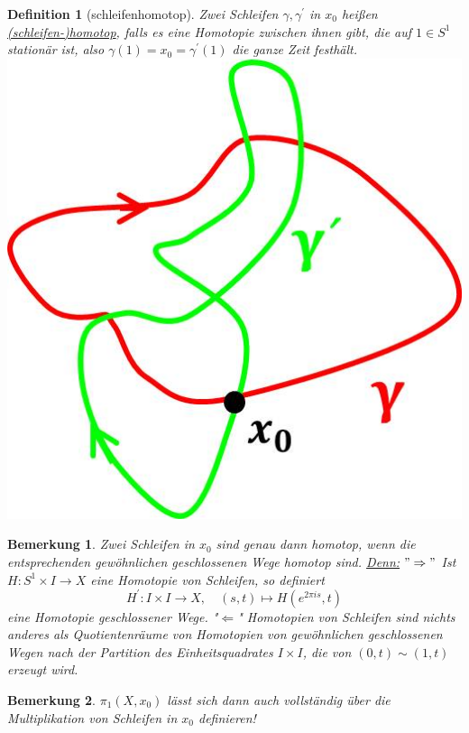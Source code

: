 \documentclass[a4paper,11pt,notitlepage]{report}
\newtheorem{definition}{Definition}[chapter]
\newtheorem{remark}{Bemerkung}[chapter]
\begin{document}
\begin{definition}[schleifenhomotop]
	Zwei Schleifen $\gamma, \gamma^\prime$ in $x_0$ heißen \underline{(schleifen-)homotop}, falls es eine Homotopie zwischen ihnen gibt, die auf $1 \in S^1$ stationär ist, also
	$\gamma(1) = x_0 = \gamma^\prime(1)$ die ganze Zeit festhält.
	 \newline \includegraphics[scale=0.3]{images/schleifenhomotop.jpg}
\end{definition}

\begin{remark}{}
	Zwei Schleifen in $x_0$ sind genau dann homotop, wenn die entsprechenden gewöhnlichen geschlossenen Wege homotop sind.
	\newline
	\underline{Denn:} $"\Rightarrow"$ Ist $H \colon S^1 \times I \rightarrow X$ eine Homotopie von Schleifen, so definiert 
	$$H^\prime \colon I \times I \rightarrow X,\quad (s,t) \mapsto H(e^{2 \pi i s}, t)$$
	eine Homotopie geschlossener Wege.
	\newline
	"$\Leftarrow$" Homotopien von Schleifen sind nichts anderes als Quotientenräume von Homotopien von gewöhnlichen geschlossenen Wegen nach der Partition des Einheitsquadrates $I \times I$, die von $(0,t) \sim (1,t)$ erzeugt wird.
\end{remark}

\begin{remark}{}
	$\pi_1(X,x_0)$ lässt sich dann auch vollständig über die Multiplikation von Schleifen in $x_0$ definieren!
\end{remark}
\end{document}
